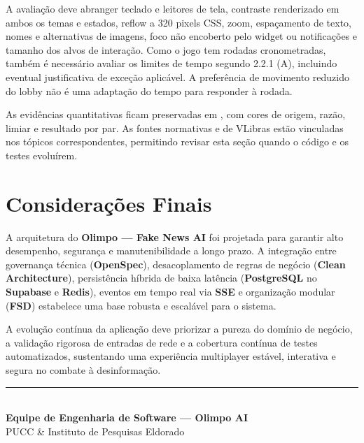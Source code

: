 \documentclass[12pt,a4paper]{article}
\begin{document}
A avaliação deve abranger teclado e leitores de tela, contraste renderizado em ambos os temas e estados, reflow a 320 pixels CSS, zoom, espaçamento de texto, nomes e alternativas de imagens, foco não encoberto pelo widget ou notificações e tamanho dos alvos de interação. Como o jogo tem rodadas cronometradas, também é necessário avaliar os limites de tempo segundo 2.2.1 (A), incluindo eventual justificativa de exceção aplicável. A preferência de movimento reduzido do lobby não é uma adaptação do tempo para responder à rodada.

As evidências quantitativas ficam preservadas em , com cores de origem, razão, limiar e resultado por par. As fontes normativas e de VLibras estão vinculadas nos tópicos correspondentes, permitindo revisar esta seção quando o código e os testes evoluírem.
\par
\endgroup

\newpage
\section{Considerações Finais}

A arquitetura do \textbf{Olimpo — Fake News AI} foi projetada para garantir alto desempenho, segurança e manutenibilidade a longo prazo. A integração entre governança técnica (\textbf{OpenSpec}), desacoplamento de regras de negócio (\textbf{Clean Architecture}), persistência híbrida de baixa latência (\textbf{PostgreSQL} no \textbf{Supabase} e \textbf{Redis}), eventos em tempo real via \textbf{SSE} e organização modular (\textbf{FSD}) estabelece uma base robusta e escalável para o sistema.

A evolução contínua da aplicação deve priorizar a pureza do domínio de negócio, a validação rigorosa de entradas de rede e a cobertura contínua de testes automatizados, sustentando uma experiência multiplayer estável, interativa e segura no combate à desinformação.

\vspace{1.5cm}
\begin{center}
  \rule{0.6\textwidth}{0.5pt}\\
  \textbf{Equipe de Engenharia de Software — Olimpo AI}\\
  PUCC \& Instituto de Pesquisas Eldorado
\end{center}

\label{LastPage}
\end{document}
